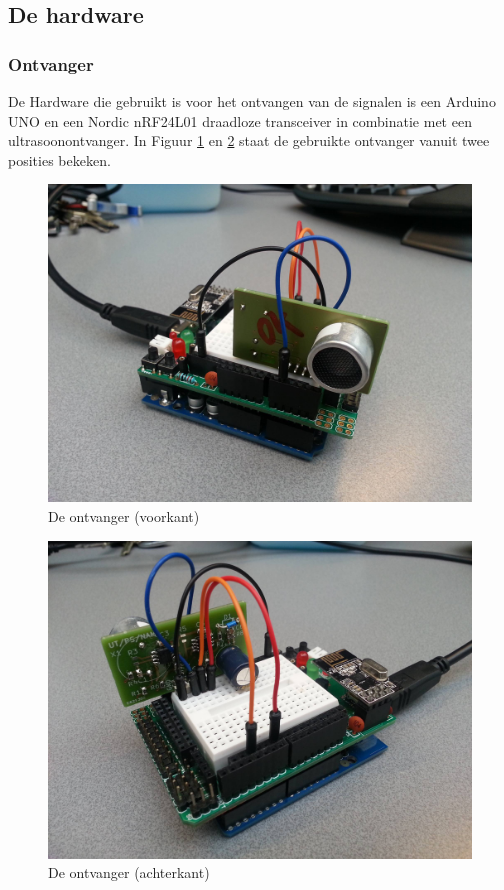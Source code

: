 \documentclass{article}
\begin{document}
\subsection{De hardware}

\subsubsection{Ontvanger}
De Hardware die gebruikt is voor het ontvangen van de signalen is een Arduino UNO en een Nordic nRF24L01 draadloze transceiver in combinatie met een ultrasoonontvanger. In Figuur \ref{voorkant} en \ref{achterkant} staat de gebruikte ontvanger vanuit twee posities bekeken.
\begin{figure}[h]
\centering\includegraphics[scale=0.06]{voorkant.jpg}
\caption{De ontvanger (voorkant)}
\label{voorkant}
\end{figure}
\begin{figure}[h]
\centering\includegraphics[scale=0.06]{achterkant.jpg}
\caption{De ontvanger (achterkant)}
\label{achterkant}
\end{figure}
\end{document}
